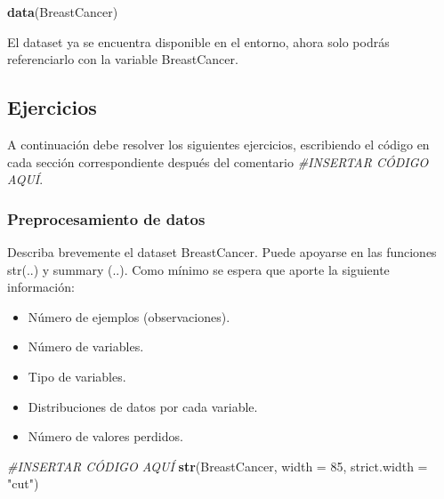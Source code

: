 \documentclass[]{article}
\newenvironment{Shaded}{\begin{snugshade}}{\end{snugshade}}
\newcommand{\CommentTok}[1]{\textcolor[rgb]{0.56,0.35,0.01}{\textit{#1}}}
\newcommand{\DataTypeTok}[1]{\textcolor[rgb]{0.13,0.29,0.53}{#1}}
\newcommand{\DecValTok}[1]{\textcolor[rgb]{0.00,0.00,0.81}{#1}}
\newcommand{\KeywordTok}[1]{\textcolor[rgb]{0.13,0.29,0.53}{\textbf{#1}}}
\newcommand{\NormalTok}[1]{#1}
\newcommand{\StringTok}[1]{\textcolor[rgb]{0.31,0.60,0.02}{#1}}
\providecommand{\tightlist}{%
  \setlength{\itemsep}{0pt}\setlength{\parskip}{0pt}}
\begin{document}
\begin{Shaded}
\begin{Highlighting}[]
\KeywordTok{data}\NormalTok{(BreastCancer)}
\end{Highlighting}
\end{Shaded}

El dataset ya se encuentra disponible en el entorno, ahora solo podrás
referenciarlo con la variable BreastCancer.

\hypertarget{ejercicios}{%
\subsection{Ejercicios}\label{ejercicios}}

A continuación debe resolver los siguientes ejercicios, escribiendo el
código en cada sección correspondiente después del comentario
\emph{\#INSERTAR CÓDIGO AQUÍ}.

\hypertarget{preprocesamiento-de-datos}{%
\subsubsection{Preprocesamiento de
datos}\label{preprocesamiento-de-datos}}

Describa brevemente el dataset BreastCancer. Puede apoyarse en las
funciones str(..) y summary (..). Como mínimo se espera que aporte la
siguiente información:

\begin{itemize}
\tightlist
\item
  Número de ejemplos (observaciones).
\item
  Número de variables.
\item
  Tipo de variables.
\item
  Distribuciones de datos por cada variable.
\item
  Número de valores perdidos.
\end{itemize}

\begin{Shaded}
\begin{Highlighting}[]
\CommentTok{#INSERTAR CÓDIGO AQUÍ}
\KeywordTok{str}\NormalTok{(BreastCancer, }\DataTypeTok{width =} \DecValTok{85}\NormalTok{, }\DataTypeTok{strict.width =} \StringTok{"cut"}\NormalTok{)}
\end{Highlighting}
\end{Shaded}
\end{document}
